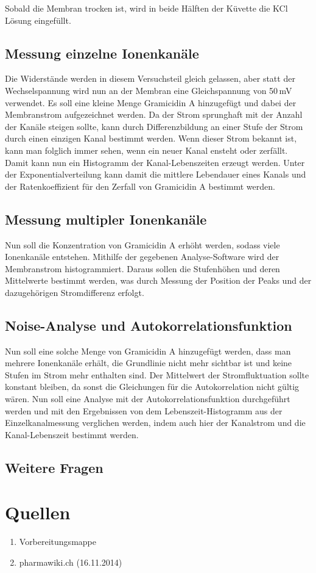 \documentclass[a4paper,ngerman]{scrartcl}
\begin{document}
Sobald die Membran trocken ist, wird in beide Hälften der Küvette die KCl Lösung eingefüllt.

\subsection{Messung einzelne Ionenkanäle}
\label{sec:singlechannels}
Die Widerstände werden in diesem Versuchsteil gleich gelassen, aber statt der Wechselspannung wird nun an der Membran eine Gleichspannung 
von 50\,mV verwendet. Es soll eine kleine Menge Gramicidin A hinzugefügt und dabei der Membranstrom aufgezeichnet werden. Da der Strom 
sprunghaft mit der Anzahl der Kanäle steigen sollte, kann durch Differenzbildung an einer Stufe der Strom durch einen einzigen Kanal bestimmt werden. Wenn dieser Strom bekannt ist, kann man folglich immer sehen, wenn ein neuer Kanal ensteht oder zerfällt.\\

Damit kann nun ein Histogramm der Kanal-Lebenszeiten erzeugt werden. Unter der Exponentialverteilung kann damit die mittlere Lebendauer 
eines Kanals und der Ratenkoeffizient für den Zerfall von Gramicidin A bestimmt werden.

\subsection{Messung multipler Ionenkanäle}
\label{sec:multiplechannels}
Nun soll die Konzentration von Gramicidin A erhöht werden, sodass viele Ionenkanäle entstehen. Mithilfe der gegebenen Analyse-Software
wird der Membranstrom histogrammiert. Daraus sollen die Stufenhöhen und deren Mittelwerte bestimmt werden, was durch Messung der Position der Peaks und der dazugehörigen Stromdifferenz erfolgt.

\subsection{Noise-Analyse und Autokorrelationsfunktion}
\label{sec:noise-autocorr}
Nun soll eine solche Menge von Gramicidin A hinzugefügt werden, dass man mehrere Ionenkanäle erhält, die Grundlinie nicht 
mehr sichtbar ist und keine Stufen im Strom mehr enthalten sind. Der Mittelwert der Stromfluktuation sollte konstant bleiben, da sonst
die Gleichungen für die Autokorrelation nicht gültig wären. Nun soll eine Analyse mit der Autokorrelationsfunktion durchgeführt werden und
mit den Ergebnissen von dem Lebenszeit-Histogramm aus der Einzelkanalmessung verglichen werden, indem auch hier der Kanalstrom und die Kanal-Lebenszeit bestimmt werden. 
\subsection{Weitere Fragen}
\label{sec:weitere-fragen}















\section{Quellen}
\begin{enumerate}
\item Vorbereitungsmappe \label{ref:mappe}
\item pharmawiki.ch (16.11.2014) \label{ref:pharmawiki}
\end{enumerate}
\end{document}
